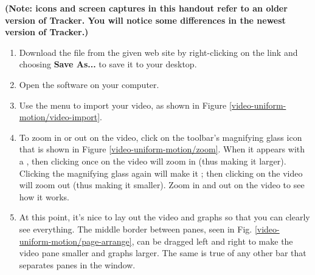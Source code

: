 


\procedure

{\bf(Note: icons and screen captures in this handout refer to an older version of Tracker. You will notice some differences in the newest version of Tracker.)}

\begin{enumerate}
	\item Download the file  from the given web site by right-clicking on the link and choosing {\bf Save As...} to save it to your desktop.
	\item Open the  software on your computer.
	\item Use the menu  to import your video, as shown in Figure \ref{video-uniform-motion/video-import}.

	
	\item To zoom in or out on the video, click on the toolbar's magnifying glass icon that is shown in Figure \ref{video-uniform-motion/zoom}. When it appears with a \button{+}, then clicking once on the video will zoom in (thus making it larger).  Clicking the magnifying glass again will make it \button{--}; then clicking on the video will zoom out (thus making it smaller). Zoom in and out on the video to see how it works.
	
	
	\item At this point, it's nice to lay out the video and graphs so that you can clearly see everything. The middle border between panes, seen in Fig. \ref{video-uniform-motion/page-arrange}, can be dragged left and right to make the video pane smaller and graphs larger. The same is true of any other bar that separates panes in the window.
	
		

\end{enumerate}
